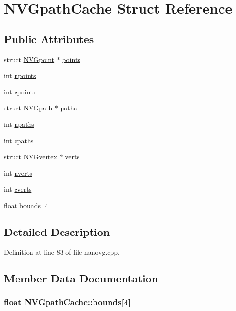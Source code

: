 \hypertarget{struct_n_v_gpath_cache}{\section{N\+V\+Gpath\+Cache Struct Reference}
\label{struct_n_v_gpath_cache}
}
\subsection*{Public Attributes}
\begin{DoxyCompactItemize}
\item 
struct \hyperlink{struct_n_v_gpoint}{N\+V\+Gpoint} $\ast$ \hyperlink{struct_n_v_gpath_cache_a52ba47cd1caf7789aceba3632e4a6cd9}{points}
\item 
int \hyperlink{struct_n_v_gpath_cache_acafbab0856b18f16da4f3c89398e53c2}{npoints}
\item 
int \hyperlink{struct_n_v_gpath_cache_aaa71429e6c6365908200a6736c31238d}{cpoints}
\item 
struct \hyperlink{struct_n_v_gpath}{N\+V\+Gpath} $\ast$ \hyperlink{struct_n_v_gpath_cache_a2b8393b9e17cc58d52ce96eb62ed0ef0}{paths}
\item 
int \hyperlink{struct_n_v_gpath_cache_ae9d1bebaf2bd3192ac194925dbf63c37}{npaths}
\item 
int \hyperlink{struct_n_v_gpath_cache_abb81be8794e77f4f587d2e4052410c76}{cpaths}
\item 
struct \hyperlink{struct_n_v_gvertex}{N\+V\+Gvertex} $\ast$ \hyperlink{struct_n_v_gpath_cache_a2f6986b4b0e13acbd9f98b67d34a8d16}{verts}
\item 
int \hyperlink{struct_n_v_gpath_cache_a6ce92987c5d5829a029e9ad7cb6eb505}{nverts}
\item 
int \hyperlink{struct_n_v_gpath_cache_a645e22306364968e61dcb2b5b4c501de}{cverts}
\item 
float \hyperlink{struct_n_v_gpath_cache_acb465a590c81dd4c068cc670988e86a1}{bounds} \mbox{[}4\mbox{]}
\end{DoxyCompactItemize}


\subsection{Detailed Description}


Definition at line 83 of file nanovg.\+cpp.



\subsection{Member Data Documentation}
\hypertarget{struct_n_v_gpath_cache_acb465a590c81dd4c068cc670988e86a1}{
\subsubsection[{bounds}]{\setlength{\rightskip}{0pt plus 5cm}float N\+V\+Gpath\+Cache\+::bounds\mbox{[}4\mbox{]}}}\label{struct_n_v_gpath_cache_acb465a590c81dd4c068cc670988e86a1}


